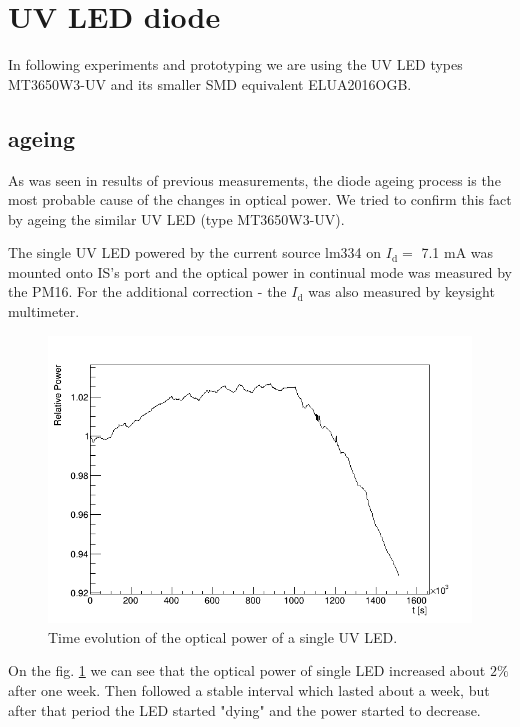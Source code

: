 \section{UV LED diode}

In following experiments and prototyping we are using the UV LED types MT3650W3-UV and its smaller SMD equivalent ELUA2016OGB.

\subsection{ageing}
As was seen in results of previous measurements, the diode ageing process is the most probable cause of the changes in optical power. We tried to confirm this fact by ageing the similar UV LED (type MT3650W3-UV).
\par
The single UV LED powered by the current source lm334 on $I_\textrm{d} =$ 7.1 mA was mounted onto IS's port and the optical power in continual mode was measured by the PM16. For the additional correction - the $I_\textrm{d} $ was also measured by keysight multimeter.


\par
\begin{figure}[H]
 \centering
 \includegraphics[scale=0.8]{./pictures/corrected1}
 \caption{Time evolution of the optical power of a single UV LED.}
 \label{SingleDiod}
\end{figure}
\par
On the fig. \ref{SingleDiod} we can see that the optical power of single LED increased about $2 \%$ after one week. Then followed a stable interval which lasted about a week, but after that period the LED started "dying" and the power started to decrease.

